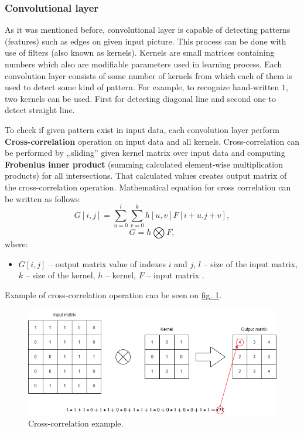     \subsubsection*{Convolutional layer}\label{sec:convolutional-layer}
    As it was mentioned before, convolutional layer is capable of detecting patterns (features) such as edges on given input picture. This process can be done with use of filters (also known as kernels). Kernels are small matrices containing numbers which also are modifiable parameters used in learning process. Each  convolution layer consists of some number of kernels from which each of them is used to detect some kind of pattern. For example, to recognize hand-written $1$, two kernels can be used. First for detecting diagonal line and second one to detect straight line.

    To check if given pattern exist in input data, each convolution layer perform \textbf{Cross-correlation} operation on input data and all kernels. Cross-correlation can be performed by ,,sliding'' given kernel matrix over input data and computing \textbf{Frobenius inner product} (summing calculated element-wise multiplication products) \cite{bib:book-frobenius-inner-product} for all intersections. That calculated values creates output matrix of the cross-correlation operation. Mathematical equation for cross correlation can be written as follows:
    \begin{equation}
        G[i, j] = \sum_{u = 0}^{l} \sum_{v = 0}^{k} h[u, v] F[i+u. j+v],
    \end{equation}
    \begin{equation}
        G = h \bigotimes F,
    \end{equation}
    where:
    \begin{itemize}[label=]
        \item $G[i, j]$ -- output matrix value of indexes $i$ and $j$, $l$ -- size of the input matrix, $k$ -- size of the kernel, $h$ -- kernel, $F$ -- input matrix \cite{bib:article-cross-correlation}.
    \end{itemize}
    Example of cross-correlation operation can be seen on \hyperref[fig:cross-correlation-example]{fig. \ref*{fig:cross-correlation-example}}.
    \begin{figure}
        \centering
        \includegraphics[width=\textwidth]{dependencies/pictures/Cross-correlation_example.png}
        \caption{Cross-correlation example.}
        \label{fig:cross-correlation-example}
    \end{figure}
